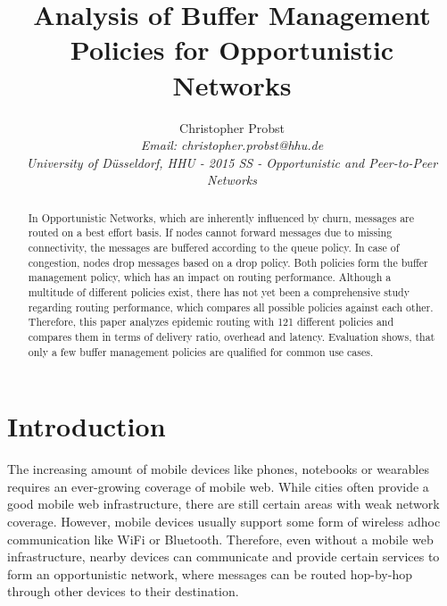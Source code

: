 \documentclass[conference,10pt,letterpaper,final]{IEEEtran}
\begin{document}
\title{Analysis of Buffer Management Policies for Opportunistic Networks}

 \author{Christopher Probst \\
 \textit{Email: christopher.probst@hhu.de}\\
 \textit{University of D\"usseldorf, HHU - 2015 SS - Opportunistic and Peer-to-Peer Networks} \\
 }


\maketitle
\thispagestyle{empty}


\begin{abstract}
In Opportunistic Networks, which are inherently influenced by churn, messages are routed on a best effort basis.
If nodes cannot forward messages due to missing connectivity, the messages are buffered according to the queue policy.
In case of congestion, nodes drop messages based on a drop policy.
Both policies form the buffer management policy, which has an impact on routing performance.
Although a multitude of different policies exist, there has not yet been a comprehensive study regarding routing performance, which compares all possible policies against each other.
Therefore, this paper analyzes epidemic routing with 121 different policies and compares them in terms of delivery ratio, overhead and latency.
Evaluation shows, that only a few buffer management policies are qualified for common use cases.
\end{abstract}




\section{Introduction}
\label{sec:introduction}

The increasing amount of mobile devices like phones, notebooks or wearables requires an ever-growing coverage of mobile web.
While cities often provide a good mobile web infrastructure, there are still certain areas with weak network coverage.
However, mobile devices usually support some form of wireless adhoc communication like WiFi or Bluetooth.
Therefore, even without a mobile web infrastructure, nearby devices can communicate and provide certain services to form an opportunistic network, where messages can be routed hop-by-hop through other devices to their destination.
\end{document}
